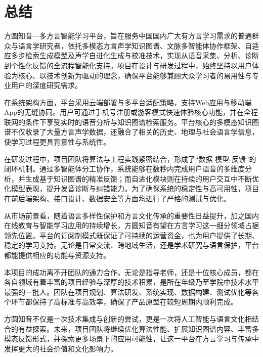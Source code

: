 \chapter{总结}
方圆知音—多方言智能学习平台，旨在服务中国国内广大有方言学习需求的普通群众与语言学研究者，依托多模态方言声学知识图谱、文脉多智能体协作框架、自适应多步检索生成模型及声学自进化生成与校准技术，实现从语音采集、分析、诊断到个性化反馈的全流程智能化支持。项目在设计与研发过程中，始终坚持以用户体验为核心、以技术创新为驱动的理念，确保平台能够兼顾大众学习者的易用性与专业用户的深度研究需求。

在系统架构方面，平台采用云端部署与多平台适配策略，支持Web应用与移动端App的无缝协同。用户可通过手机号注册或游客模式快速体验核心功能，并在全程联网的条件下享受实时的语音分析与知识图谱检索服务。平台核心的多模态知识图谱不仅收录了大量方言声学数据，还融合了相关的历史、地理与社会语言学信息，使学习过程更具背景性与系统性。

在研发过程中，项目团队将算法与工程实践紧密结合，形成了“数据-模型-反馈”的闭环机制。通过多智能体分工协作，系统能够在数秒内完成用户语音的多维度分析，并生成基于知识图谱的精准反馈；而自进化模块则在持续的用户交互中不断优化模型表现，提升发音诊断与纠错能力。为了确保系统的稳定性与高可用性，项目在前后端架构、接口设计、数据安全等方面均进行了严格的测试与优化。

从市场前景看，随着语言多样性保护和方言文化传承的重要性日益提升，加之国内在线教育与智能学习应用的持续增长，方圆知音有望在方言学习这一细分领域占据领先位置。平台的订阅制模式既保证了可持续的运营资金，也为用户提供了长期、稳定的学习支持。无论是日常交流、跨地域生活，还是学术研究与语言保护，平台都能提供相应的功能与资源支持。

本项目的成功离不开团队的通力合作。无论是指导老师，还是十位核心成员，都在各自领域有着丰富的项目经验与深厚的技术积累，是所在年级乃至学院中技术水平最强的一批人。团队在项目规划、算法研发、系统实现、数据构建、测试优化等各个环节都保持了高标准与高效率，确保了产品原型在较短周期内顺利完成。

方圆知音不仅是一次技术集成与创新的尝试，更是一次将人工智能与语言文化相结合的有益探索。未来，项目团队将继续优化算法性能、扩展知识图谱内容、丰富多模态反馈形式，并探索更多场景下的应用可能性，让这一平台在方言学习与传承中发挥更大的社会价值和文化影响力。

